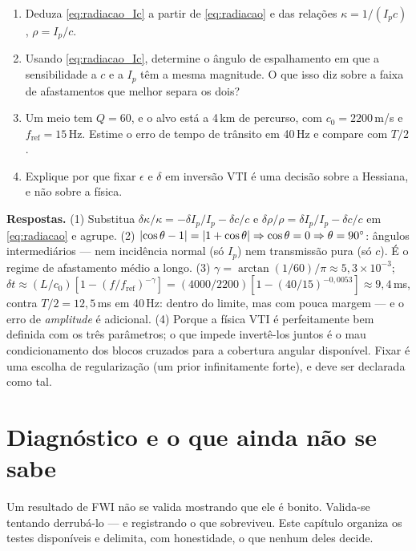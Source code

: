 \documentclass[11pt,a4paper,oneside]{report}
\begin{document}
\begin{exercicio}[Problemas]
\begin{enumerate}[leftmargin=*, itemsep=2pt]
\item Deduza \eqref{eq:radiacao_Ic} a partir de \eqref{eq:radiacao} e das
rela\c{c}\~oes $\kappa = 1/(I_p c)$, $\rho = I_p/c$.
\item Usando \eqref{eq:radiacao_Ic}, determine o \^angulo de espalhamento em
que a sensibilidade a $c$ e a $I_p$ t\^em a mesma magnitude. O que isso diz
sobre a faixa de afastamentos que melhor separa os dois?
\item Um meio tem $Q = 60$, e o alvo est\'a a 4\,km de percurso, com
$c_0 = 2200$\,m/s e $f_{\text{ref}} = 15$\,Hz. Estime o erro de tempo de
tr\^ansito em 40\,Hz e compare com $T/2$.
\item Explique por que fixar $\epsilon$ e $\delta$ em invers\~ao VTI \'e uma
decis\~ao sobre a Hessiana, e n\~ao sobre a f\'isica.
\end{enumerate}
\textbf{Respostas.} (1) Substitua
$\delta\kappa/\kappa = -\delta I_p/I_p - \delta c/c$ e
$\delta\rho/\rho = \delta I_p/I_p - \delta c/c$ em \eqref{eq:radiacao} e
agrupe. (2) $\lvert \cos\theta-1 \rvert = \lvert 1+\cos\theta \rvert
\Rightarrow \cos\theta = 0 \Rightarrow \theta = 90^\circ$: \^angulos
intermedi\'arios --- nem incid\^encia normal (s\'o $I_p$) nem transmiss\~ao
pura (s\'o $c$). \'E o regime de afastamento m\'edio a longo. (3)
$\gamma = \arctan(1/60)/\pi \approx 5{,}3\times10^{-3}$;
$\delta t \approx (L/c_0)[1-(f/f_{\text{ref}})^{-\gamma}]
= (4000/2200)[1 - (40/15)^{-0{,}0053}] \approx 9{,}4$\,ms, contra
$T/2 = 12{,}5$\,ms em 40\,Hz: dentro do limite, mas com pouca margem --- e o
erro de \emph{amplitude} \'e adicional. (4) Porque a f\'isica VTI \'e
perfeitamente bem definida com os tr\^es par\^ametros; o que impede
invert\^e-los juntos \'e o mau condicionamento dos blocos cruzados para a
cobertura angular dispon\'ivel. Fixar \'e uma escolha de
regulariza\c{c}\~ao (um prior infinitamente forte), e deve ser declarada como
tal.
\end{exercicio}

\chapter{Diagn\'ostico e o que ainda n\~ao se sabe}
\label{cap:diagnostico}

\begin{ideia}
Um resultado de FWI n\~ao se valida mostrando que ele \'e bonito. Valida-se
tentando derrub\'a-lo --- e registrando o que sobreviveu. Este cap\'itulo
organiza os testes dispon\'iveis e delimita, com honestidade, o que nenhum
deles decide.
\end{ideia}
\end{document}
